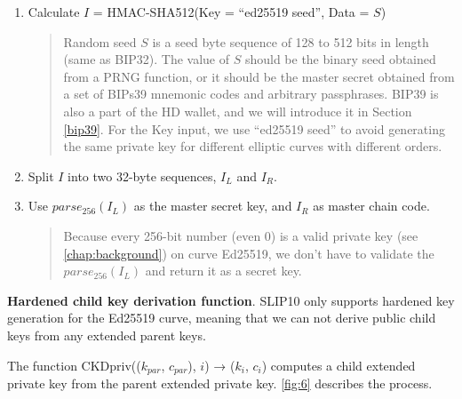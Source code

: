 \begin{enumerate}
    \item Calculate $I$ = HMAC-SHA512(Key = “ed25519 seed”, Data = $S$)

          \begin{quote}
              Random seed $S$ is a seed byte sequence of 128 to 512 bits in length (same as BIP32). The value of $S$ should be the binary seed obtained from a PRNG function, or it should be the master secret obtained from a set of BIPs39 mnemonic codes and arbitrary passphrases. BIP39 is also a part of the HD wallet, and we will introduce it in Section \ref{bip39}. For the Key input, we use “ed25519 seed” to avoid generating the same private key for different elliptic curves with different orders.
          \end{quote}

          \bigskip

    \item Split $I$ into two 32-byte sequences, $I_L$ and $I_R$.
          \bigskip

    \item Use $parse_{256}(I_L)$ as the master secret key, and $I_R$ as master chain code.

          \begin{quote}
              Because every 256-bit number (even 0) is a valid private key (see \ref{chap:background}) on curve Ed25519, we don’t have to validate the $parse_{256}(I_L)$ and return it as a secret key.
          \end{quote}
\end{enumerate}

\bigskip
{\textbf{Hardened child key derivation function}}. SLIP10 only supports hardened key generation for the Ed25519 curve, meaning that we can not derive public child keys from any extended parent keys.

The function CKDpriv(($k_{par}$, $c_{par}$), $i$) → ($k_i$, $c_i$) computes a child extended private key from the parent extended private key. \autoref{fig:6} describes the process.

